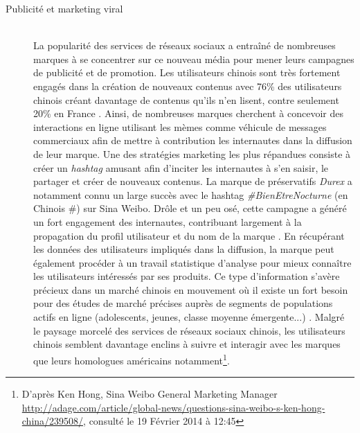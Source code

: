 \begin{description}
\item[Publicité et marketing viral]
\hfill \\
La popularité des services de réseaux sociaux a entra\^iné de nombreuses marques à se concentrer sur ce nouveau média pour mener leurs campagnes de publicité et de promotion. Les utilisateurs chinois sont très fortement engagés dans la création de nouveaux contenus avec 76\% des
utilisateurs chinois créant davantage de contenus qu{\textquoteright}ils n{\textquoteright}en lisent, contre seulement 20\% en France \citep{Forrester2013}. Ainsi, de nombreuses marques cherchent à concevoir des interactions en ligne utilisant les mèmes comme véhicule de messages commerciaux afin de
mettre à contribution les internautes dans la diffusion de leur marque. Une des stratégies marketing les plus répandues consiste à créer un \textit{hashtag} amusant afin d{\textquoteright}inciter les internautes à s{\textquoteright}en saisir, le partager et créer de nouveaux contenus. La marque de préservatifs \textit{Durex} a notamment connu un large succès avec le hashtag \textit{\#BienEtreNocturne} (en Chinois \#) sur Sina Weibo. Drôle et un peu osé, cette campagne a généré un fort engagement des internautes, contribuant largement à la propagation du profil utilisateur et du nom de la marque \citep{Shi2012}. En récupérant les données des utilisateurs impliqués dans la diffusion, la marque peut également procéder à un travail statistique d{\textquoteright}analyse pour mieux conna\^itre les utilisateurs intéressés par ses produits. Ce type d{\textquoteright}information s{\textquoteright}avère précieux dans un marché chinois en mouvement o\`u il existe un fort besoin pour des études de marché précises auprès de segments de populations actifs en ligne (adolescents, jeunes, classe moyenne émergente...) \citep{Bergstrom2012}. Malgré le paysage morcelé des services de réseaux sociaux chinois, les utilisateurs chinois semblent davantage enclins à suivre et interagir avec les marques que leurs homologues américains notamment\footnote{ D{\textquoteright}après Ken Hong, Sina Weibo General Marketing Manager  \url{http://adage.com/article/global-news/questions-sina-weibo-s-ken-hong-china/239508/,} consulté le 19 Février 2014 à 12:45}. 



\end{description}
